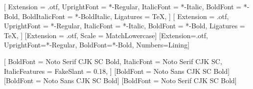 
\usepackage[
  paperwidth  = 176mm,
  paperheight = 250mm,
  inner       = 21mm,
  outer       = 17mm,
  top         = 22mm,
  bottom      = 24mm,
  headheight  = 14pt,
  headsep     = 6mm,
  footskip    = 11mm,
]{geometry}

\usepackage{fontspec}
\usepackage{unicode-math}

\setmainfont{LibertinusSerif}[
  Extension      = .otf,
  UprightFont    = *-Regular,
  ItalicFont     = *-Italic,
  BoldFont       = *-Bold,
  BoldItalicFont = *-BoldItalic,
  Ligatures      = TeX,
]
\setsansfont{LibertinusSans}[
  Extension      = .otf,
  UprightFont    = *-Regular,
  ItalicFont     = *-Italic,
  BoldFont       = *-Bold,
  Ligatures      = TeX,
]
\setmonofont{LibertinusMono-Regular}[Extension = .otf, Scale = MatchLowercase]
\newfontfamily{}[Extension=.otf, UprightFont=*-Regular,
  BoldFont=*-Bold, Numbers=Lining]

[
  BoldFont       = Noto Serif CJK SC Bold,
  ItalicFont     = Noto Serif CJK SC,
  ItalicFeatures = {FakeSlant = 0.18},
]
[BoldFont = Noto Sans CJK SC Bold]
\newCJKfontfamily{}[BoldFont = Noto Sans CJK SC Bold]
\newCJKfontfamily{}[BoldFont = Noto Serif CJK SC Bold]

\usepackage{amsmath, mathtools}   %
\usepackage{booktabs, array}
\usepackage{enumitem}
\usepackage{graphicx}
\usepackage{pifont}
\usepackage{microtype}
\usepackage{tikz}
\usetikzlibrary{calc}
\usepackage[most]{tcolorbox}
\usepackage{titlesec}
\usepackage{titletoc}
\usepackage{fancyhdr}
\usepackage{emptypage}

